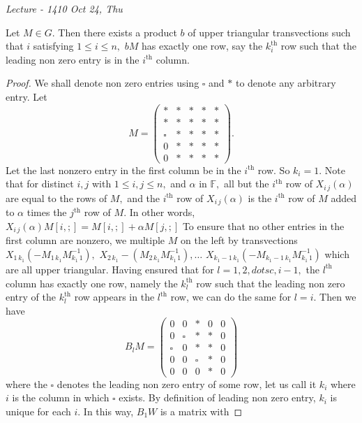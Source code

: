 
\noindent
\emph{Lecture - 14\hfill 10 Oct 24, Thu}

\begin{lemma}
	Let $M \in G.$ Then there exists a product $b$ of upper triangular transvections such that $i$ satisfying $1 \leq i \leq n,$ $b M$ has exactly one row, say the $k_i^\text{th}$ row such that the leading non zero entry is in the $i^\text{th}$ column.
\end{lemma}

\begin{proof}
We shall denote non zero entries using $\square$ and $\ast$ to denote any arbitrary entry.
Let 
$$ M = \begin{pmatrix}
	  \ast & \ast & \ast & \ast &\ast \\
	  \ast & \ast & \ast & \ast &\ast \\
	  \square & \ast & \ast & \ast &\ast \\
	    0  & \ast & \ast & \ast &\ast \\
	    0  & \ast & \ast & \ast &\ast
  \end{pmatrix} .$$
Let the last nonzero entry in the first column be in the $i^\text{th}$ row. So $k_i = 1.$
Note that for distinct $i,j$ with $1 \leq i,j \leq n,$ and $\alpha$ in
$\mathbb{F},$ all but the $i^\text{th}$ row of $X_{i \, j }(\alpha)$ are equal to
the rows of $M,$ and the $i^\text{th}$ row of $X_{i \, j} ( \alpha)$ is the $i^\text{th}$ row of $M$ added to $ \alpha$ times the $j^\text{th}$ row of $M.$
In other words, $X_{i \, j } ( \alpha) M[i, ;] = M[i,;] + \alpha M[j,;]$
To ensure that no other entries in the first column are nonzero, we multiple $M$ on the left by transvections $X_{1\, k_1}(-M_{1\,k_1} M_{k_1\,1}^{-1}),$ $ X_{2\, k_1}-(M_{2\,k_1} M_{k_1\,1}^{-1}), \dotsc$ $ X_{k_1-1\, k_1}(-M_{k_1-1 \,k_1} M_{k_1\,1}^{-1})$ which are all upper triangular.
Having ensured that for $l = 1, 2, dotsc, i-1,$ the $l^\text{th}$ column has exactly one row, namely the $k_l^\text{th}$ row such that the leading non zero entry of the $k_l^\text{th}$ row appears in the $l^\text{th}$ row, we can do the same for $l = i.$ Then we have
$$ B_l M = \begin{pmatrix}
	     0    &   0    &   \ast  &    0    &    0    \\
	     0    & \square&   \ast  &  \ast   &    0    \\
	  \square &   0    &   \ast  &  \ast   &    0    \\
	     0    &   0    & \square &  \ast   &    0    \\
	     0    &   0    &    0    &  \ast   &    0    
     \end{pmatrix} $$
     where the $\square$ denotes the leading non zero entry of some row, let us call it $k_i$ where $i$ is the column in which $\square$ exists. By definition of leading non zero entry, $k_i$ is unique for each $i.$  In this way, $B_1W$ is a matrix with 
\end{proof}


